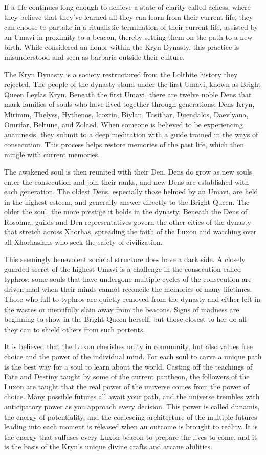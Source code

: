 \documentclass[10pt,a4paper,twoside,bg=print,twocolumn,openany,nodeprecatedcode]{dndbook}
\begin{document}
If a life continues long enough to achieve a state of clarity called achess, where they believe that they've learned all they can learn from their current life, they can choose to partake in a ritualistic termination of their current life, assisted by an Umavi in proximity to a beacon, thereby setting them on the path to a new birth. While considered an honor within the Kryn Dynasty, this practice is misunderstood and seen as barbaric outside their culture.

The Kryn Dynasty is a society restructured from the Lolthite history they rejected. The people of the dynasty stand under the first Umavi, known as Bright Queen Leylas Kryn. Beneath the first Umavi, there are twelve noble Dens that mark families of souls who have lived together through generations: Dens Kryn, Mirimm, Thelyss, Hythenos, Icozrin, Biylan, Tasithar, Duendalos, Daev'yana, Omrifar, Beltune, and Zolaed. When someone is believed to be experiencing anamnesis, they submit to a deep meditation with a guide trained in the ways of consecution. This process helps restore memories of the past life, which then mingle with current memories.

The awakened soul is then reunited with their Den. Dens do grow as new souls enter the consecution and join their ranks, and new Dens are established with each generation. The oldest Dens, especially those helmed by an Umavi, are held in the highest esteem, and generally answer directly to the Bright Queen. The older the soul, the more prestige it holds in the dynasty. Beneath the Dens of Rosohna, guilds and Den representatives govern the other cities of the dynasty that stretch across Xhorhas, spreading the faith of the Luxon and watching over all Xhorhasians who seek the safety of civilization.

This seemingly benevolent societal structure does have a dark side. A closely guarded secret of the highest Umavi is a challenge in the consecution called typhros: some souls that have undergone multiple cycles of the consecution are driven mad when their minds cannot reconcile the memories of many lifetimes. Those who fall to typhros are quietly removed from the dynasty and either left in the wastes or mercifully slain away from the beacons. Signs of madness are beginning to show in the Bright Queen herself, but those closest to her do all they can to shield others from such portents.

It is believed that the Luxon cherishes unity in community, but also values free choice and the power of the individual mind. For each soul to carve a unique path is the best way for a soul to learn about the world. Casting off the teachings of Fate and Destiny taught by some of the current pantheon, the followers of the Luxon are taught that the real power of the universe comes from the power of choice. Many possible futures all await your path, and the universe trembles with anticipatory power as you approach every decision. This power is called dunamis, the energy of potentiality, and the coalescing architecture of the multiple futures leading into each moment is released when an outcome is brought to reality. It is the energy that suffuses every Luxon beacon to prepare the lives to come, and it is the basis of the Kryn's unique divine crafts and arcane abilities.
\end{document}
